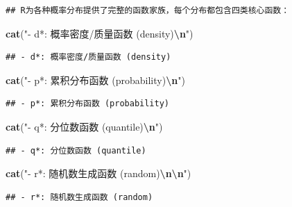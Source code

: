 \documentclass[
  twoside]{book}
\newenvironment{Shaded}{\begin{snugshade}}{\end{snugshade}}
\newcommand{\FunctionTok}[1]{\textcolor[rgb]{0.13,0.29,0.53}{\textbf{#1}}}
\newcommand{\NormalTok}[1]{#1}
\newcommand{\SpecialCharTok}[1]{\textcolor[rgb]{0.81,0.36,0.00}{\textbf{#1}}}
\newcommand{\StringTok}[1]{\textcolor[rgb]{0.31,0.60,0.02}{#1}}
\begin{document}
\begin{verbatim}
## R为各种概率分布提供了完整的函数家族，每个分布都包含四类核心函数：
\end{verbatim}

\begin{Shaded}
\begin{Highlighting}[]
\FunctionTok{cat}\NormalTok{(}\StringTok{"{-} d*: 概率密度/质量函数 (density)}\SpecialCharTok{\textbackslash{}n}\StringTok{"}\NormalTok{)}
\end{Highlighting}
\end{Shaded}

\begin{verbatim}
## - d*: 概率密度/质量函数 (density)
\end{verbatim}

\begin{Shaded}
\begin{Highlighting}[]
\FunctionTok{cat}\NormalTok{(}\StringTok{"{-} p*: 累积分布函数 (probability)}\SpecialCharTok{\textbackslash{}n}\StringTok{"}\NormalTok{)}
\end{Highlighting}
\end{Shaded}

\begin{verbatim}
## - p*: 累积分布函数 (probability)
\end{verbatim}

\begin{Shaded}
\begin{Highlighting}[]
\FunctionTok{cat}\NormalTok{(}\StringTok{"{-} q*: 分位数函数 (quantile)}\SpecialCharTok{\textbackslash{}n}\StringTok{"}\NormalTok{)}
\end{Highlighting}
\end{Shaded}

\begin{verbatim}
## - q*: 分位数函数 (quantile)
\end{verbatim}

\begin{Shaded}
\begin{Highlighting}[]
\FunctionTok{cat}\NormalTok{(}\StringTok{"{-} r*: 随机数生成函数 (random)}\SpecialCharTok{\textbackslash{}n\textbackslash{}n}\StringTok{"}\NormalTok{)}
\end{Highlighting}
\end{Shaded}

\begin{verbatim}
## - r*: 随机数生成函数 (random)
\end{verbatim}
\end{document}
